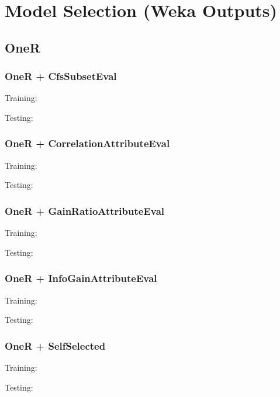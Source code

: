\documentclass{article}
\begin{document}
\section{Model Selection (Weka Outputs)}\label{app:Model Selection (Weka Outputs)}

\subsection{OneR}
\subsubsection{OneR + CfsSubsetEval}\label{app:OneR + CfsSubsetEval weka outputs}
Training:

Testing: 


\subsubsection{OneR + CorrelationAttributeEval}\label{app:OneR + CorrelationAttributeEval weka outputs}
Training:

Testing:


\subsubsection{OneR + GainRatioAttributeEval}\label{app:OneR + GainRatioAttributeEval weka outputs}
Training:

Testing:


\subsubsection{OneR + InfoGainAttributeEval}\label{app:OneR + InfoGainAttributeEval weka outputs}
Training:

Testing:


\subsubsection{OneR + SelfSelected}\label{app:OneR + SelfSelected weka outputs}
Training:

Testing:

\end{document}
